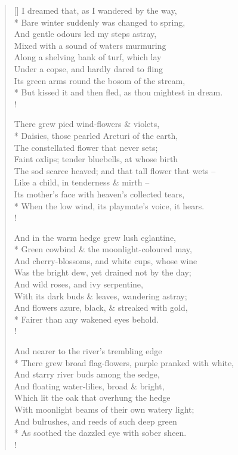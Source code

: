 \documentclass[MAIN]{subfiles}
\begin{document}
\settowidth{\versewidth}{I dreamed that, as I wandered by the way,}
\begin{verse}[\versewidth]
I dreamed that, as I wandered by the way,\\*
\vin Bare winter suddenly was changed to spring,\\
And gentle odours led my steps astray,\\
\vin Mixed with a sound of waters murmuring\\
Along a shelving bank of turf, which lay\\
\vin Under a copse, and hardly dared to fling\\
Its green arms round the bosom of the stream,\\*
But kissed it and then fled, as thou mightest in dream.\\!

There grew pied wind-flowers \& violets,\\*
\vin Daisies, those pearled Arcturi of the earth,\\
The constellated flower that never sets;\\
\vin Faint oxlips; tender bluebells, at whose birth\\
The sod scarce heaved; and that tall flower that wets --\\
\vin Like a child,  in tenderness \& mirth --\\
Its mother's face with heaven's collected tears,\\*
When the low wind, its playmate's voice, it hears.\\!

And in the warm hedge grew lush eglantine,\\*
\vin Green cowbind \& the moonlight-coloured may,\\
And cherry-blossoms, and white cups, whose wine\\
\vin Was the bright dew, yet drained not by the day;\\
And wild roses, and ivy serpentine,\\
\vin With its dark buds \& leaves, wandering astray;\\
And flowers azure, black, \& streaked with gold,\\*
Fairer than any wakened eyes behold.\\!

And nearer to the river's trembling edge\\*
\vin There grew broad flag-flowers, purple pranked with white,\\
And starry river buds among the sedge,\\
\vin And floating water-lilies, broad \& bright,\\
Which lit the oak that overhung the hedge\\
\vin With moonlight beams of their own watery light;\\
And bulrushes, and reeds of such deep green\\*
As soothed the dazzled eye with sober sheen.\\!


\end{verse}
\end{document}
